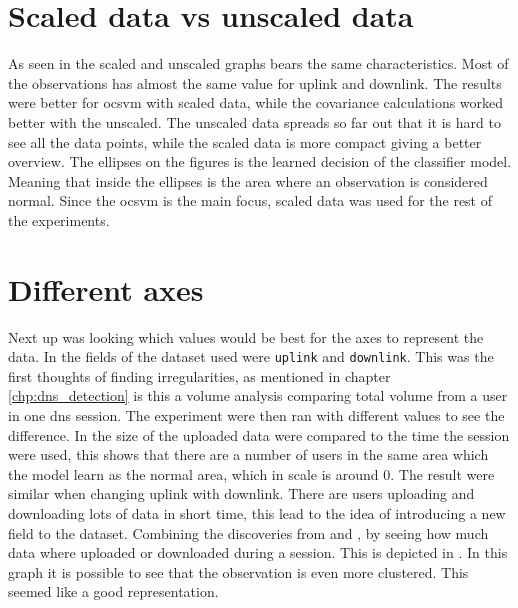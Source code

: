 \section{Scaled data vs unscaled data}
As seen in  the scaled and unscaled graphs bears the same characteristics. Most of the observations has almost the same value for uplink and downlink. 
The results were better for \gls{ocsvm} with scaled data, while the covariance calculations worked better with the unscaled. The unscaled data spreads so far out that it is hard to see all the data points, while the scaled data is more compact giving a better overview. The ellipses on the figures is the learned decision of the classifier model. Meaning that inside the ellipses is the area where an observation is considered normal. Since the \gls{ocsvm} is the main focus, scaled data was used for the rest of the experiments.

\section{Different axes}
Next up was looking which values would be best for the axes to represent the data. In  the fields of the dataset used were \texttt{uplink} and \texttt{downlink}. This was the first thoughts of finding irregularities, as mentioned in chapter \ref{chp:dns_detection} is this a volume analysis comparing total volume from a user in one \gls{dns} session. The experiment were then ran with different values to see the difference. In  the size of the uploaded data were compared to the time the session were used, this shows that there are a number of users in the same area which the model learn as the normal area, which in scale is around 0. The result were similar when changing uplink with downlink. There are users uploading and downloading lots of data in short time, this lead to the idea of introducing a new field to the dataset. Combining the discoveries from  and , by seeing how much data where uploaded or downloaded during a session. This is depicted in . In this graph it is possible to see that the observation is even more clustered. This seemed like a good representation. 


